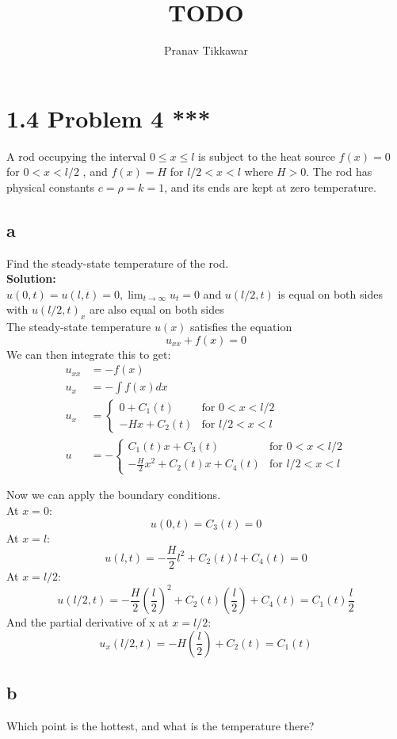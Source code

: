 \documentclass{article}
\author{Pranav Tikkawar}
\title{TODO}
\begin{document}
\maketitle

\section*{1.4 Problem 4 ***}
A rod occupying the interval $0 \leq x \leq l$ is subject to the heat source
$f(x) = 0$ for $0 < x < l/2$ , and $f(x) = H$ for $l/2 < x < l$ where $H > 0$. The rod has physical constants $c = \rho = k = 1$, and its ends are kept at zero temperature.
\subsection*{a} 
Find the steady-state temperature of the rod.\\
\textbf{Solution:} \\
$u(0, t) = u(l, t) = 0, \lim_{t \rightarrow \infty} u_t = 0$ and $u(l/2, t)$ is equal on both sides with $u(l/2,t)_x$ are also equal on both sides\\
The steady-state temperature $u(x)$ satisfies the equation
$$ u_{xx} + f(x) = 0 $$
We can then integrate this to get:
\begin{align*}
u_{xx} &= -f(x) \\
u_{x} &= -\int f(x) dx \\
u_{x} &= \begin{cases}
0 + C_1(t) & \text{for } 0 < x < l/2 \\
-Hx + C_2(t) & \text{for } l/2 < x < l
\end{cases}\\
u &= -\begin{cases}
C_1(t)x + C_3(t) & \text{for } 0 < x < l/2 \\
-\frac{H}{2}x^2 + C_2(t)x + C_4(t) & \text{for } l/2 < x < l
\end{cases}
\end{align*}

Now we can apply the boundary conditions.\\

At $x = 0$:
$$u(0,t) = C_3(t) = 0$$
At $x = l$:
$$u(l,t) = -\frac{H}{2}l^2 + C_2(t)l + C_4(t) = 0$$
At $x = l/2$:
$$u(l/2,t) = -\frac{H}{2}\left(\frac{l}{2}\right)^2 + C_2(t)\left(\frac{l}{2}\right) + C_4(t) = C_1(t)\frac{l}{2}$$
And the partial derivative of x at $x = l/2$:
$$u_x(l/2,t) = -H\left(\frac{l}{2}\right) + C_2(t) = C_1(t)$$


\subsection*{b} 
Which point is the hottest, and what is the temperature there?
\end{document}
